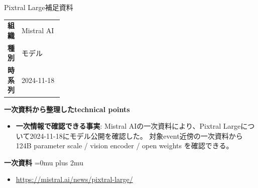 \begin{technicalnote}{Pixtral Large}{補足資料}
\begingroup
\begin{tabularx}{\linewidth}{@{}>{\bfseries}p{0.22\linewidth}X@{}}
組織 & Mistral AI \\
種別 & モデル \\
時系列 & 2024-11-18 \\
\end{tabularx}
\smallskip
{\bfseries 一次資料から整理したtechnical points}
\begin{itemize}[leftmargin=1.5em,itemsep=0.35em]
\item \textbf{一次情報で確認できる事実}: Mistral AIの一次資料により、Pixtral Largeについて2024-11-18にモデル公開を確認した。 対象event近傍の一次資料から 124B parameter scale / vision encoder / open weights を確認できる。
\end{itemize}
\begin{minipage}{\linewidth}
\begin{samepage}
{\bfseries 一次資料}
\begingroup\sloppy
\Urlmuskip=0mu plus 2mu\relax
\begin{itemize}[leftmargin=1.5em,itemsep=0.25em]
\item {\scriptsize\url{https://mistral.ai/news/pixtral-large/}}
\end{itemize}
\endgroup
\end{samepage}
\end{minipage}
\endgroup
\end{technicalnote}
\medskip
